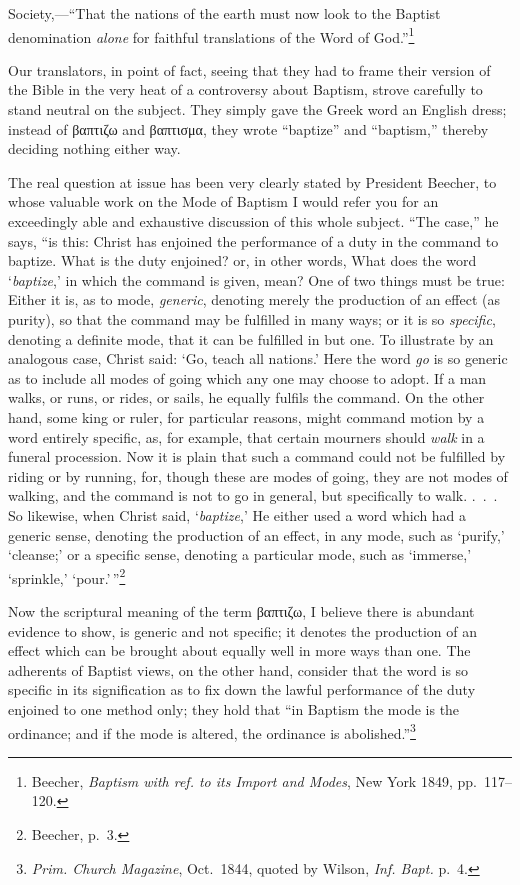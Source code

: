 \documentclass[
  english,
]{book}
\newcommand{\textgreek}[2][]{\foreignlanguage{greek}{#2}}
\begin{document}
Society,---``That the nations of the earth must now look to the Baptist denomination \emph{alone} for faithful translations of the Word of God.''\footnote{Beecher, \emph{Baptism with ref. to its Import and Modes}, New York 1849, pp.~117--120.}

Our translators, in point of fact, seeing that they had to frame their version of the Bible in the very heat of a controversy about Baptism, strove carefully to stand neutral on the subject. They simply gave the Greek word an English dress; instead of \textgreek{βαπτιζω} and \textgreek{βαπτισμα}, they wrote ``baptize'' and ``baptism,'' thereby deciding nothing either way.

The real question at issue has been very clearly stated by President Beecher, to whose valuable work on the Mode of Baptism I would refer you for an exceedingly able and exhaustive discussion of this whole subject. ``The case,'' he says, ``is this: Christ has enjoined the performance of a duty in the command to baptize. What is the duty enjoined? or, in other words, What does the word `\emph{baptize},' in which the command is given, mean? One of two things must be true: Either it is, as to mode, \emph{generic}, denoting merely the production of an effect (as purity), so that the command may be fulfilled in many ways; or it is so \emph{specific}, denoting a definite mode, that it can be fulfilled in but one. To illustrate by an analogous case, Christ said: `Go, teach all nations.' Here the word \emph{go} is so generic as to include all modes of going which any one may choose to adopt. If a man walks, or runs, or rides, or sails, he equally fulfils the command. On the other hand, some king or ruler, for particular reasons, might command motion by a word entirely specific, as, for example, that certain mourners should \emph{walk} in a funeral procession. Now it is plain that such a command could not be fulfilled by riding or by running, for, though these are modes of going, they are not modes of walking, and the command is not to go in general, but specifically to walk. .~.~. So likewise, when Christ said, `\emph{baptize},' He either used a word which had a generic sense, denoting the production of an effect, in any mode, such as `purify,' `cleanse;' or a specific sense, denoting a particular mode, such as `immerse,' `sprinkle,' `pour.'\,''\footnote{Beecher, p.~3.}

Now the scriptural meaning of the term \textgreek{βαπτιζω}, I believe there is abundant evidence to show, is generic and not specific; it denotes the production of an effect which can be brought about equally well in more ways than one. The adherents of Baptist views, on the other hand, consider that the word is so specific in its signification as to fix down the lawful performance of the duty enjoined to one method only; they hold that ``in Baptism the mode is the ordinance; and if the mode is altered, the ordinance is abolished.''\footnote{\emph{Prim. Church Magazine}, Oct.~1844, quoted by Wilson, \emph{Inf. Bapt.} p.~4.}
\end{document}
